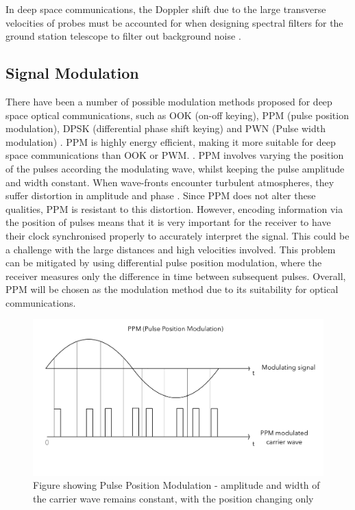 \documentclass[12pt]{article}
\begin{document}
In deep space communications, the Doppler shift due to the large transverse velocities of probes must be accounted for when designing spectral filters for the ground station telescope to filter out background noise \cite{dsocpysche}.

\subsection{Signal Modulation}
 
There have been a number of possible modulation methods proposed for deep space optical communications, such as OOK (on-off keying), PPM (pulse position modulation), DPSK (differential phase shift keying) and PWN (Pulse width modulation) \cite{ppm}. PPM is highly energy efficient, making it more suitable for deep space communications than OOK or PWM. \cite{dsocpysche}. PPM involves varying the position of the pulses according the modulating wave, whilst keeping the pulse amplitude and width constant. When wave-fronts encounter turbulent atmospheres, they suffer distortion in amplitude and phase \cite{ppm}. Since PPM does not alter these qualities, PPM is resistant to this distortion. However, encoding information via the position of pulses means that it is very important for the receiver to have their clock synchronised properly to accurately interpret the signal. This could be a challenge with the large distances and high velocities involved. This problem can be mitigated by using differential pulse position modulation, where the receiver measures only the difference in time between subsequent pulses. Overall, PPM will be chosen as the modulation method due to its suitability for optical communications. 


\begin{figure}[H]
    \centering
    \includegraphics[width = 15cm]{Media/Document/ppm.png}
    \caption{Figure showing Pulse Position Modulation - amplitude and width of the carrier wave remains constant, with the position changing only}
    \label{ppm}
\end{figure}
\end{document}
